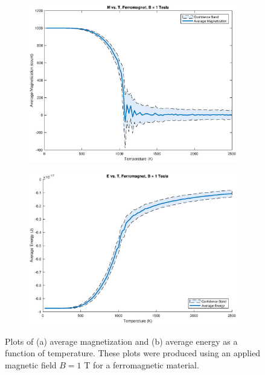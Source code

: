 \documentclass[12pt]{article}
\begin{document}
\begin{figure}[!h]
\begin{subfigure}{0.5\textwidth}
\includegraphics[width=\linewidth]{./Ferrographs/ferroMvsT.eps}
\caption{\label{ferroMvsT}}
\end{subfigure}
\begin{subfigure}{0.5\textwidth}
\includegraphics[width=\linewidth]{./Ferrographs/ferroEvsT.eps}
\caption{\label{ferroEvsT}}
\end{subfigure}
\caption{Plots of (a) average magnetization and (b) average energy as a function of temperature.  These plots were produced using an applied magnetic field $B = 1$ T for a ferromagnetic material.} 
\end{figure} 
\end{document}
